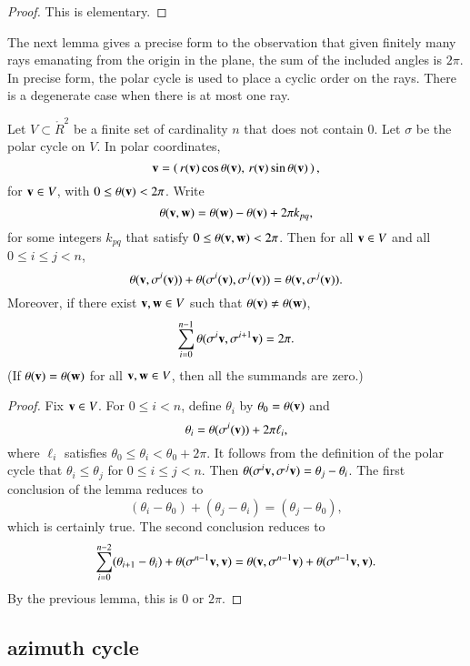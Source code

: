 \begin{proof} This is elementary.
\end{proof}

The next lemma gives a precise form to the observation
that given finitely many rays emanating from the origin
in the plane, the sum of the included angles is $2\pi$.
In precise form, the polar cycle is used to place
a cyclic order on the rays.  There is a degenerate case
when there is at most one ray.


\begin{lemma}\label{lemma:polar-sum}
Let $V\subset\ring{R}^2$ be a finite set
of cardinality $n$ that does not contain $0$.
Let $\sigma$ be the polar cycle on $V$.  
In polar coordinates,
$${\mathbf v}=\left(\, r({\mathbf v})\cos\theta({\mathbf v}),\, r({\mathbf v})\sin\theta({\mathbf v})\,\right),$$ 
for ${\mathbf v}\in V$, with
$0\le\theta({\mathbf v})<2\pi$.
Write
   $$
   \theta({\mathbf v},{\mathbf w}) = \theta({\mathbf w}) - \theta({\mathbf v}) + 2\pi k_{pq},
   $$
for some integers $k_{pq}$ that satisfy $0\le \theta({\mathbf v},{\mathbf w}) < 2\pi$.
Then for all ${\mathbf v}\in V$
and all $0\le i \le j < n$,
   $$
   \theta({\mathbf v},\sigma^i({\mathbf v})) +\theta(\sigma^i({\mathbf v}),\sigma^j({\mathbf v})) =
   \theta({\mathbf v},\sigma^j({\mathbf v})).
   $$
Moreover, if there exist ${\mathbf v},{\mathbf w}\in V$ such that $\theta({\mathbf v})\ne\theta({\mathbf w})$,
  $$
  \sum_{i=0}^{n-1} \theta(\sigma^{i}{\mathbf v},\sigma^{i+1} {\mathbf v}) = 2\pi.
  $$
(If $\theta({\mathbf v})=\theta({\mathbf w})$ for all ${\mathbf v},{\mathbf w}\in V$, then all the
summands are zero.)
\end{lemma}
%

\begin{proof}
Fix ${\mathbf v}\in V$.
For $0\le i<n$, define $\theta_i$ by
   $\theta_0=\theta({\mathbf v})$ and 
   $$\theta_i = \theta(\sigma^i({\mathbf v})) + 2\pi \ell_i,$$
where  $\ell_i$ satisfies $\theta_0\le \theta_i < \theta_0+2\pi$.
It follows from the definition of the polar cycle that
$\theta_i \le \theta_j$ for $0\le i\le j < n$.  Then
$\theta(\sigma^i {\mathbf v} ,\sigma^j {\mathbf v}) = \theta_j - \theta_i$.
The first conclusion of the lemma reduces to
  $$
  (\theta_i-\theta_0) + (\theta_j-\theta_i) = (\theta_j-\theta_0),
  $$
which is certainly true.
The second conclusion reduces to
  $$
  \sum_{i=0}^{n-2} (\theta_{i+1}-\theta_i) + \theta(\sigma^{n-1}{\mathbf v},{\mathbf v})
  = \theta({\mathbf v},\sigma^{n-1}{\mathbf v}) + \theta(\sigma^{n-1}{\mathbf v},{\mathbf v}).
  $$
By the previous lemma, this is $0$ or $2\pi$.
\end{proof}


\subsection{azimuth cycle}

